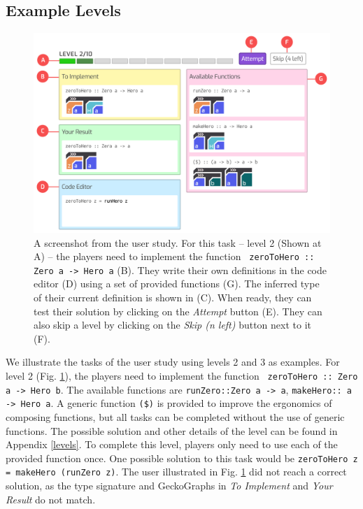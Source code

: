 \documentclass[preprint,12pt]{elsarticle}
\begin{document}
\subsection{Example Levels}
\begin{figure}[h]
  \includegraphics[width=\linewidth]{figures/Level2}
  \caption{\label{fig:level-example} A screenshot from the user study. For this task -- level 2 (Shown at A) -- the players need to implement the function \texttt{ zeroToHero :: Zero a -> Hero a} (B). They write their own definitions in the code editor (D) using a set of provided functions (G). The inferred type of their current definition is shown in (C). When ready, they can test their solution by clicking on the \textit{Attempt} button (E). They can also skip a level by clicking on the \textit{Skip (n left)} button next to it (F).}
  
\end{figure}

We illustrate the tasks of the user study using levels 2 and 3 as examples. For level 2 (Fig. \ref{fig:level-example}), the players need to implement the function \texttt{ zeroToHero :: Zero a -> Hero b}. The available functions are \texttt{runZero::Zero a -> a}, \texttt{makeHero:: a -> Hero a}. A generic function \texttt{(\$)} is provided to improve the ergonomics of composing functions, but all tasks can be completed without the use of generic functions. The possible solution and other details of the level can be found in Appendix \ref{levels}. To complete this level, players only need to use each of the provided function once. One possible solution to this task would be {\tt zeroToHero z = makeHero (runZero z)}. The user illustrated in Fig. \ref{fig:level-example} did not reach a correct solution, as the type signature and GeckoGraphs in {\it To Implement} and {\it Your Result} do not match.
\end{document}
